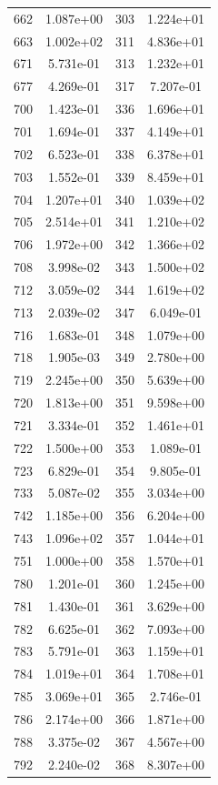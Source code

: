 \documentclass[12pt]{article}
\begin{document}
\begin{longtable}{@{}cccc@{}}
662 & 1.087e+00 & 303 & 1.224e+01 \\
663 & 1.002e+02 & 311 & 4.836e+01 \\
671 & 5.731e-01 & 313 & 1.232e+01 \\
677 & 4.269e-01 & 317 & 7.207e-01 \\
700 & 1.423e-01 & 336 & 1.696e+01 \\
701 & 1.694e-01 & 337 & 4.149e+01 \\
702 & 6.523e-01 & 338 & 6.378e+01 \\
703 & 1.552e-01 & 339 & 8.459e+01 \\
704 & 1.207e+01 & 340 & 1.039e+02 \\
705 & 2.514e+01 & 341 & 1.210e+02 \\
706 & 1.972e+00 & 342 & 1.366e+02 \\
708 & 3.998e-02 & 343 & 1.500e+02 \\
712 & 3.059e-02 & 344 & 1.619e+02 \\
713 & 2.039e-02 & 347 & 6.049e-01 \\
716 & 1.683e-01 & 348 & 1.079e+00 \\
718 & 1.905e-03 & 349 & 2.780e+00 \\
719 & 2.245e+00 & 350 & 5.639e+00 \\
720 & 1.813e+00 & 351 & 9.598e+00 \\
721 & 3.334e-01 & 352 & 1.461e+01 \\
722 & 1.500e+00 & 353 & 1.089e-01 \\
723 & 6.829e-01 & 354 & 9.805e-01 \\
733 & 5.087e-02 & 355 & 3.034e+00 \\
742 & 1.185e+00 & 356 & 6.204e+00 \\
743 & 1.096e+02 & 357 & 1.044e+01 \\
751 & 1.000e+00 & 358 & 1.570e+01 \\
780 & 1.201e-01 & 360 & 1.245e+00 \\
781 & 1.430e-01 & 361 & 3.629e+00 \\
782 & 6.625e-01 & 362 & 7.093e+00 \\
783 & 5.791e-01 & 363 & 1.159e+01 \\
784 & 1.019e+01 & 364 & 1.708e+01 \\
785 & 3.069e+01 & 365 & 2.746e-01 \\
786 & 2.174e+00 & 366 & 1.871e+00 \\
788 & 3.375e-02 & 367 & 4.567e+00 \\
792 & 2.240e-02 & 368 & 8.307e+00 \\

\end{longtable}
\end{document}
